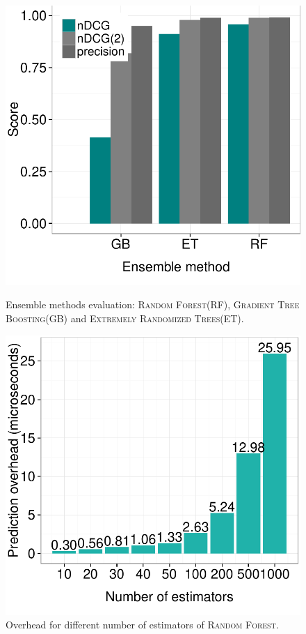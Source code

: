 \begin{figure}[htbp]
	\begin{minipage}[t]{0.48\linewidth}
     \includegraphics[width=.95\textwidth]{inputs/img/ensemble_method_eval}
		\caption{Ensemble methods evaluation: \textsc{Random Forest}(RF), \textsc{Gradient Tree Boosting}(GB) and \textsc{Extremely Randomized Trees}(ET).}
		\label{fig:ensemble_method_eval}
	\end{minipage}
	\hspace{0.1cm}
	\begin{minipage}[t]{0.48\linewidth}
		\includegraphics[width=.95\textwidth]{inputs/img/rf_learners}
		\caption{Overhead for different number of estimators of \textsc{Random Forest}.}
		\label{fig:rf_learners}
	\end{minipage}
\end{figure}

